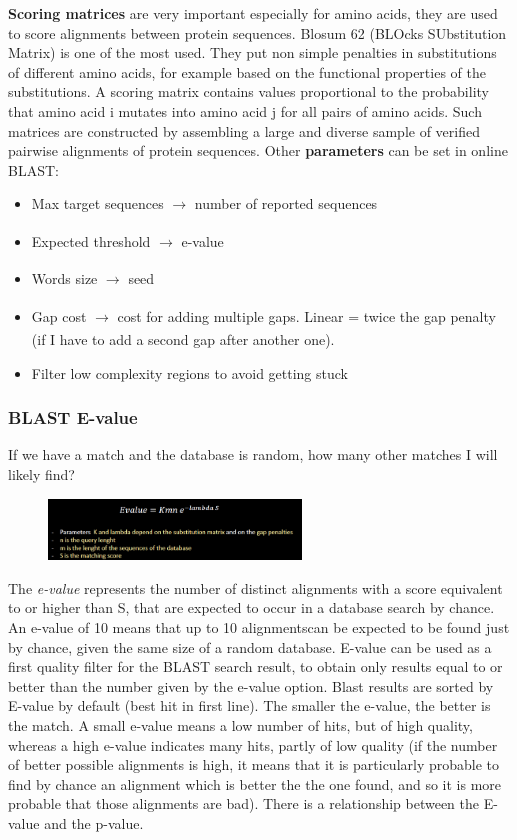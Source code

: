 \textbf{Scoring matrices} are very important especially for amino acids, they are used to score alignments between protein sequences. Blosum 62 (BLOcks SUbstitution Matrix) is one of the most used.
They put non simple penalties in substitutions of different amino acids, for example based on the functional properties of the substitutions. A scoring matrix contains values proportional to the probability that amino acid i mutates into amino acid j for all pairs of amino acids. Such matrices are constructed by assembling a large and diverse sample of verified pairwise alignments of protein sequences.
Other \textbf{parameters} can be set in online BLAST:

\begin{itemize}
    \item Max target sequences $\xrightarrow[]{}$ number of reported sequences 
    \item Expected threshold $\xrightarrow[]{}$ e-value
    \item Words size $\xrightarrow[]{}$ seed
    \item Gap cost $\xrightarrow[]{}$ cost for adding multiple gaps. Linear = twice the gap penalty (if I have to add a second gap after another one).
    \item Filter low complexity regions to avoid getting stuck 
\end{itemize}

\subsubsection{BLAST E-value}

If we have a match and the database is random, how many other matches I will likely find?

\begin{figure}[h]
\centering
\includegraphics[width=0.6\textwidth]{Evalue.png}
\caption{}
\end{figure}

The \emph{e-value} represents the number of distinct alignments with a score equivalent to or higher than S, that are expected to occur in a database search by chance. An e-value of 10 means that up to 10 alignmentscan be expected to be found just by chance, given the same size of a random database. E-value can be used as a first quality filter for the BLAST search result, to obtain only results equal to or better than the number given by the e-value option. Blast results are sorted by E-value by default (best hit in first line).
The smaller the e-value, the better is the match. A small e-value means a low number of hits, but of high quality, whereas a high e-value indicates many hits, partly of low quality (if the number of better possible alignments is high, it means that it is particularly probable to find by chance an alignment which is better the the one found, and so it is more probable that those alignments are bad). 
There is a relationship between the E-value and the p-value. 

